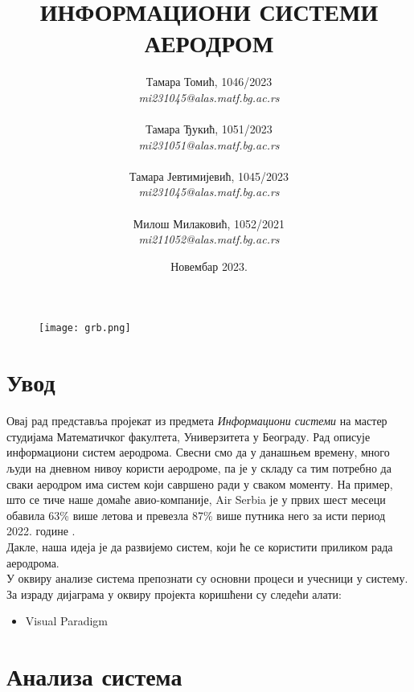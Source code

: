 \documentclass{article}
\title{\textbf{ИНФОРМАЦИОНИ СИСТЕМИ} \\
\vspace{10}
\Large{\textbf{АЕРОДРОМ}}}
\author{Тамара Томић, 1046/2023 \\ \textit{mi231045@alas.matf.bg.ac.rs} \\\\
        Тамара Ђукић, 1051/2023 \\ \textit{mi231051@alas.matf.bg.ac.rs} \\\\
        Тамара Јевтимијевић, 1045/2023 \\ \textit{mi231045@alas.matf.bg.ac.rs} \\\\
        Милош Милаковић, 1052/2021 \\ \textit{mi211052@alas.matf.bg.ac.rs}}
\date{Новембар 2023.}
\begin{document}
\maketitle

\vspace{17}
\begin{figure}[h!]
    \centering
    \texttt{[image: grb.png]}
\end{figure} 

\newpage
\tableofcontents

\newpage

\section{Увод}
Овај рад представља пројекат из предмета \textit{Информациони системи} на мастер студијама Математичког факултета, Универзитета у Београду. Рад описује информациони систем аеродрома. 
 Свесни смо да у данашњем времену, много људи на дневном нивоу користи аеродроме, па је у складу са тим потребно да сваки аеродром има систем који савршено ради у сваком моменту. На пример, што се тиче наше домаће авио-компаније, Air Serbia је у првих шест месеци обавила 63\% више летова и превезла 87\% више путника него за исти период 2022. године \cite{bbc_srbija}. \\ 
 Дакле, наша идеја је да развијемо систем, који ће се користити приликом рада аеродрома.\\
У оквиру анализе система препознати су основни процеси и учесници у систему. За израду дијаграма у оквиру пројекта коришћени су следећи алати:
\begin{itemize}
    \item Visual Paradigm
\end{itemize}

\section{Анализа система}
\end{document}
